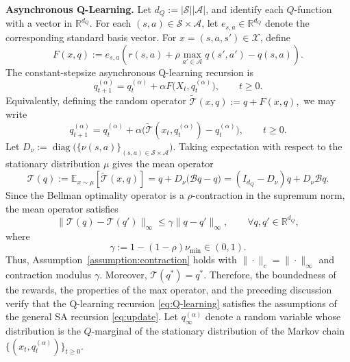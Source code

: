 \documentclass[11pt,letterpaper]{article}
\theoremstyle{plain}
\theoremstyle{definition}
\theoremstyle{remark}
\newcommand{\E}{\mathbb{E}}
\newcommand{\mS}{\mathcal{S}}
\newcommand{\mA}{\mathcal{A}}
\newcommand{\mT}{\mathcal{T}}
\newcommand{\R}{\mathbb{R}}
\newcommand{\tmT}{\widetilde{\mT}}
\begin{document}
\noindent\textbf{Asynchronous Q-Learning.}
Let \(d_Q:=|\mS||\mA|\), and identify each \(Q\)-function with a vector in
\(\R^{d_Q}\). For each \((s,a)\in\mS\times\mA\), let
\(e_{s,a}\in\R^{d_Q}\) denote the corresponding standard basis vector.
For \(x=(s,a,s')\in\mathcal X\), define
\begin{equation*}
    F(x,q)
    :=
    e_{s,a}
    \left(
        r(s,a)
        +
        \rho\max_{a'\in\mA}q(s',a')
        -
        q(s,a)
    \right).
\end{equation*}
The constant-stepsize asynchronous Q-learning recursion \cite{chen2024lyapunov} is
\begin{equation*}
    q_{t+1}^{(\alpha)}
    =
    q_t^{(\alpha)}
    +
    \alpha F\bigl(X_t,q_t^{(\alpha)}\bigr),
    \qquad t\geq0.
\end{equation*}
Equivalently, defining the random  operator $\widetilde{\mathcal T}(x,q)
    :=
    q+F(x,q),$ we may write
\begin{equation}\label{eq:Q-learning}
 q_{t+1}^{(\alpha)}
    =
    q_t^{(\alpha)}
    +
    \alpha \big(\tmT(x_t, q_t^{(\alpha)})-q_t^{(\alpha)}\big),\qquad t \geq 0.
\end{equation}
Let $D_\nu
    :=
    \operatorname{diag}
    \bigl(\{\nu(s,a)\}_{(s,a)\in\mS\times\mA}\bigr).$ Taking expectation with respect to the stationary distribution \(\mu\) gives
the mean operator
\begin{equation}
\label{eq:q-mean-operator}
    \mT(q):=
    \E_{x\sim\mu}
    \left[
        \tmT(x,q)
    \right] =
    q+D_\nu\bigl(\mathcal Bq-q\bigr) =
    (I_{d_Q}-D_\nu)q+D_\nu\mathcal Bq.
\end{equation}
Since the Bellman optimality operator is a
\(\rho\)-contraction in the supremum norm, the mean operator satisfies
\[
    \|\mT(q)-\mT(q')\|_\infty
    \leq
    \gamma\|q-q'\|_\infty,
    \qquad
    \forall q,q'\in\R^{d_Q},
\]
where
\[
    \gamma:=1-(1-\rho)\nu_{\min}\in(0,1).
\]
Thus, Assumption~\ref{assumption:contraction} holds with
\(\|\cdot\|_c=\|\cdot\|_\infty\) and contraction modulus \(\gamma\).
Moreover, \(\mT(q^*)=q^*\).
Therefore, the boundedness of the rewards, the properties of the max operator,
and the preceding discussion verify that the Q-learning recursion
\eqref{eq:Q-learning} satisfies the assumptions of the general SA recursion
\eqref{eq:update}. Let \(q_\infty^{(\alpha)}\) denote a random variable whose
distribution is the \(Q\)-marginal of the stationary distribution of the
Markov chain \(\{(x_t,q_t^{(\alpha)})\}_{t\ge0}\).
\end{document}
